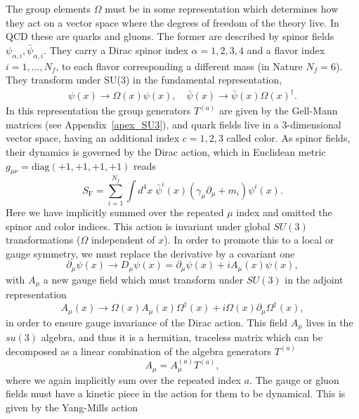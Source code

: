 The group elements $\Omega$ must be in some representation which determines how they act on a vector space where the degrees of freedom of the theory live. In QCD these are quarks and gluons. The former are described by spinor fields $\psi_{\alpha,i},\bar{\psi}_{\alpha,i}$. They carry a Dirac spinor index $\alpha=1,2,3,4$ and a flavor index $i=1,...,N_f$, to each flavor corresponding a different mass (in Nature $N_f=6$). They transform under SU(3) in the fundamental representation,
\begin{gather}
\psi(x)\to\Omega(x)\psi(x), \quad \bar{\psi}(x)\to\bar{\psi}(x)\Omega(x)^{\dagger}.
\end{gather}
In this representation the group generators $T^{(a)}$ are given by the Gell-Mann matrices (see Appendix~\ref{apex_SU3}), and quark fields live in a 3-dimensional vector space, having an additional index $c=1,2,3$ called color. As spinor fields, their dynamics is governed by the Dirac action, which in Euclidean metric $g_{\mu\nu}=\textrm{diag}(+1,+1,+1,+1)$ reads
\begin{equation}
S_{\textrm{F}}=\sum_{i=1}^{N_f}\int d^4x\;\bar{\psi}^{i}(x)\left(\gamma_{\mu}\partial_{\mu}+m_i\right)\psi^i(x).
\end{equation} 
Here we have implicitly summed over the repeated $\mu$ index and omitted the spinor and color indices. This action is invariant under global $SU(3)$ transformations ($\Omega$ independent of $x$). In order to promote this to a local or gauge symmetry, we must replace the derivative by a covariant one
\begin{equation}
\partial_{\mu}\psi(x)\to D_{\mu}\psi(x)=\partial_{\mu}\psi(x)+iA_{\mu}(x)\psi(x),
\end{equation}
with $A_{\mu}$ a new gauge field which must transform under $SU(3)$ in the adjoint representation
\begin{equation}
\label{ch_foundation:eq:Agauge}
A_{\mu}(x)\to\Omega(x)A_{\mu}(x)\Omega^{\dagger}(x)+i\Omega(x)\partial_{\mu}\Omega^{\dagger}(x),
\end{equation}
in order to ensure gauge invariance of the Dirac action. This field $A_{\mu}$ lives in the $su(3)$ algebra, and thus it is a hermitian, traceless matrix which can be decomposed as a linear combination of the algebra generators $T^{(a)}$
\begin{equation}
A_{\mu}=A_{\mu}^{(a)}T^{(a)},
\end{equation}
where we again implicitly sum over the repeated index $a$. The gauge or gluon fields must have a kinetic piece in the action for them to be dynamical. This is given by the Yang-Mills action
